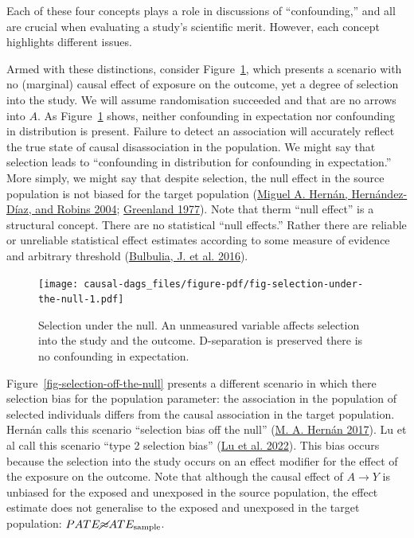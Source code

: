 \documentclass[
  singlecolumn]{report}
\begin{document}
Each of these four concepts plays a role in discussions of
``confounding,'' and all are crucial when evaluating a study's
scientific merit. However, each concept highlights different issues.

Armed with these distinctions, consider
Figure~\ref{fig-selection-under-the-null}, which presents a scenario
with no (marginal) causal effect of exposure on the outcome, yet a
degree of selection into the study. We will assume randomisation
succeeded and that are no arrows into \(A\). As
Figure~\ref{fig-selection-under-the-null} shows, neither confounding in
expectation nor confounding in distribution is present. Failure to
detect an association will accurately reflect the true state of causal
disassociation in the population. We might say that selection leads to
``confounding in distribution for confounding in expectation.'' More
simply, we might say that despite selection, the null effect in the
source population is not biased for the target population
(\protect\hyperlink{ref-hernuxe1n2004}{Miguel A. Hernán, Hernández-Díaz,
and Robins 2004}; \protect\hyperlink{ref-greenland1977}{Greenland
1977}). Note that therm ``null effect'' is a structural concept. There
are no statistical ``null effects.'' Rather there are reliable or
unreliable statistical effect estimates according to some measure of
evidence and arbitrary threshold
(\protect\hyperlink{ref-bulbuliaj.2016}{Bulbulia, J. et al. 2016}).

\begin{figure}

{\centering \texttt{[image: causal-dags\_files/figure-pdf/fig-selection-under-the-null-1.pdf]}

}

\caption{\label{fig-selection-under-the-null}Selection under the null.
An unmeasured variable affects selection into the study and the outcome.
D-separation is preserved there is no confounding in expectation.}

\end{figure}

Figure~\ref{fig-selection-off-the-null} presents a different scenario in
which there selection bias for the population parameter: the association
in the population of selected individuals differs from the causal
association in the target population. Hernán calls this scenario
``selection bias off the null''
(\protect\hyperlink{ref-hernuxe1n2017}{M. A. Hernán 2017}). Lu et al
call this scenario ``type 2 selection bias''
(\protect\hyperlink{ref-lu2022}{Lu et al. 2022}). This bias occurs
because the selection into the study occurs on an effect modifier for
the effect of the exposure on the outcome. Note that although the causal
effect of \(A\to Y\) is unbiased for the exposed and unexposed in the
source population, the effect estimate does not generalise to the
exposed and unexposed in the target population:
\(PATE \cancel{\approx} ATE_{\text{sample}}\).
\end{document}
